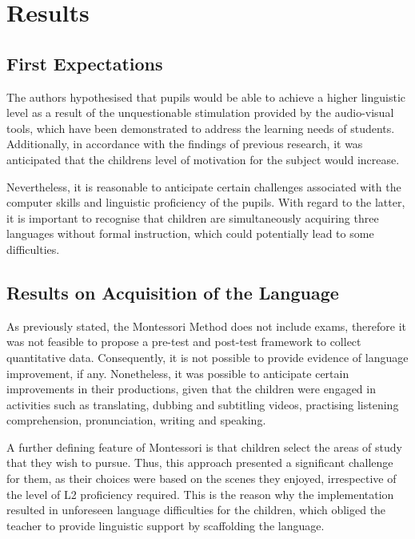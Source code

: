 \section{Results}\label{sec-results}

\subsection{First Expectations}\label{sub-sec-firstexpectations}

The authors hypothesised that pupils would be able to achieve a higher
linguistic level as a result of the unquestionable stimulation provided
by the audio-visual tools, which have been demonstrated to address the
learning needs of students. Additionally, in accordance with the
findings of previous research, it was anticipated that the
children\textquotesingle s level of motivation for the subject would
increase.

Nevertheless, it is reasonable to anticipate certain challenges
associated with the computer skills and linguistic proficiency of the
pupils. With regard to the latter, it is important to recognise that
children are simultaneously acquiring three languages without formal
instruction, which could potentially lead to some difficulties.

\subsection{Results on Acquisition of the Language}\label{sub-sec-resultsonacquisition}

As previously stated, the Montessori Method does not include exams,
therefore it was not feasible to propose a pre-test and post-test
framework to collect quantitative data. Consequently, it is not possible
to provide evidence of language improvement, if any. Nonetheless, it was
possible to anticipate certain improvements in their productions, given
that the children were engaged in activities such as translating,
dubbing and subtitling videos, practising listening comprehension,
pronunciation, writing and speaking.

A further defining feature of Montessori is that children select the
areas of study that they wish to pursue. Thus, this approach presented a
significant challenge for them, as their choices were based on the
scenes they enjoyed, irrespective of the level of L2 proficiency
required. This is the reason why the implementation resulted in
unforeseen language difficulties for the children, which obliged the
teacher to provide linguistic support by scaffolding the language.

